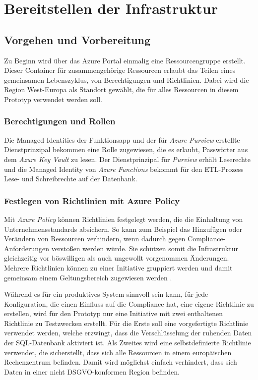 \section{Bereitstellen der Infrastruktur} \label{sec:infra}

\subsection{Vorgehen und Vorbereitung} \label{subsec:infra:azDevOps}
Zu Beginn wird über das Azure Portal einmalig eine Ressourcengruppe erstellt. Dieser Container für zusammengehörige Ressourcen erlaubt das Teilen eines gemeinsamen Lebenszyklus, von Berechtigungen und Richtlinien. Dabei wird die Region West-Europa als Standort gewählt, die für alles Ressourcen in diesem Prototyp verwendet werden soll. 

\subsubsection{Berechtigungen und Rollen} \label{subsec:infra:prep:aad}
Die Managed Identities der Funktionsapp und der für \textit{Azure Purview} erstellte Dienstprinzipal bekommen eine Rolle zugewiesen, die es erlaubt, Passwörter aus dem \textit{Azure Key Vault} zu lesen. Der Dienstprinzipal für \textit{Purview} erhält Leserechte und
die Managed Identity von \textit{Azure Functions} bekommt für den ETL-Prozess Lese- und Schreibrechte auf der Datenbank.

\subsubsection{Festlegen von Richtlinien mit Azure Policy} \label{subsec:infra:prep:policy}
Mit \textit{Azure Policy} können Richtlinien festgelegt werden, die die Einhaltung von Unternehmensstandards absichern. So kann zum Beispiel das Hinzufügen oder Verändern von Ressourcen verhindern, wenn dadurch gegen Compliance-Anforderungen verstoßen werden würde. Sie schützen somit die Infrastruktur gleichzeitig vor böswilligen als auch ungewollt vorgenommen Änderungen. Mehrere Richtlinien können zu einer Initiative gruppiert werden und damit gemeinsam einem Geltungsbereich zugewiesen werden \cite{de_tender_azure_2019}.

Während es für ein produktives System sinnvoll sein kann, für jede Konfiguration, die einen Einfluss auf die Compliance hat, eine eigene Richtlinie zu erstellen, wird für den Prototyp nur eine Initiative mit zwei enthaltenen Richtlinie zu Testzwecken erstellt. Für die Erste soll eine vorgefertigte Richtlinie verwendet werden, welche erzwingt, dass die Verschlüsselung der ruhenden Daten der SQL-Datenbank aktiviert ist. Als Zweites wird eine selbstdefinierte Richtlinie verwendet, die sicherstellt, dass sich alle Ressourcen in einem europäischen Rechenzentrum befinden. Damit wird möglichst einfach verhindert, dass sich Daten in einer nicht DSGVO-konformen Region befinden.

